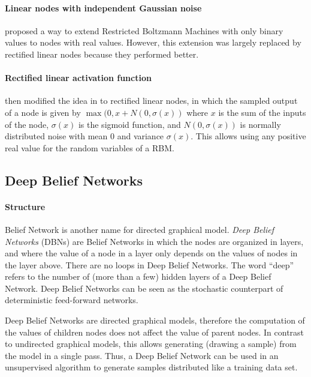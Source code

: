 \paragraph{Linear nodes with independent Gaussian noise}

\cite{HintonSalakhutdinov2006} proposed a way to extend Restricted
Boltzmann Machines with only binary values to nodes with real values.
However, this extension was largely replaced by rectified linear nodes
because they performed better.

\paragraph{Rectified linear activation function\label{par:Rectified-linear-activation-function}}

\cite{NairHinton2010} then modified the idea in \cite{HintonSalakhutdinov2006}
to rectified linear nodes, in which the sampled output of a node is
given by $\max(0,x+N(0,\sigma(x))$ where $x$ is the sum of the inputs
of the node, $\sigma(x)$ is the sigmoid function, and $N(0,\sigma(x))$
is normally distributed noise with mean $0$ and variance $\sigma(x)$.
This allows using any positive real value for the random variables
of a RBM.


\subsection{Deep Belief Networks\label{subsec:Deep-Belief-Network}}

\paragraph{Structure}

Belief Network is another name for directed
graphical model. \emph{Deep Belief Networks}
(DBNs) are Belief Networks in which the nodes are organized
in layers, and where the value of a node in a layer only depends on
the values of nodes in the layer above. There are no loops in Deep
Belief Networks. The word ``deep'' refers to the number of (more
than a few) hidden layers of a Deep Belief Network. Deep Belief Networks
can be seen as the stochastic counterpart of deterministic feed-forward
networks.

Deep Belief Networks are directed graphical models, therefore the
computation of the values of children nodes does not affect the value
of parent nodes. In contrast to undirected graphical models, this
allows generating (drawing a sample) from the model in a single pass.
Thus, a Deep Belief Network can be used in an unsupervised algorithm
to generate samples distributed like a training data set.

